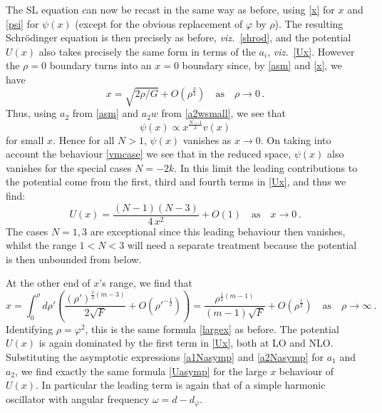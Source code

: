\documentclass[11pt,a4paper]{article}
\numberwithin{figure}{section}
\numberwithin{equation}{section}
\newcommand{\be}{\begin{equation}}
\newcommand{\ee}{\end{equation}}
\newcommand{\viz}{{\it viz.}\ }
\newcommand{\ph}{\varphi}
\begin{document}
The SL equation can now be recast in the same way as before, using \eqref{x} for $x$  and \eqref{psi} for $\psi(x)$ (except for the obvious replacement of $\ph$ by $\rho$). The resulting Schr\"odinger equation is then precisely as before, \viz \eqref{shrod}, and the potential $U(x)$ also takes precisely the same form in terms of the $a_i$, \viz \eqref{Ux}. 
However the $\rho=0$ boundary turns into an $x=0$ boundary since, by \eqref{asm} and \eqref{x}, we have
\begin{equation} \label{xsmall}
    x = \sqrt{2\rho/G} + O\left( \rho^\frac{3}{2} \right) \quad \text{as} \quad \rho \rightarrow 0 \,.
\end{equation}
Thus, using $a_2$ from \eqref{asm} and $a_2w$ from \eqref{a2wsmall}, we see that
\be\label{psism} \psi(x)\propto x^{\frac{N-1}{2}}v(x)\ee
for small $x$. Hence for all $N>1$, $\psi(x)$ vanishes as $x\to0$.  On taking into account the behaviour \eqref{vmcase} we see that in the reduced space, $\psi(x)$ also vanishes for the special cases $N=-2k$. In this limit the leading contributions to the potential come from the first, third and fourth terms in \eqref{Ux}, and thus we find:
\begin{equation} \label{Usm}
    U(x) = \frac{(N-1)(N-3)}{4\,x^2} +O(1)
 \quad \text{as} \quad x \rightarrow 0 \,.
\end{equation}
The cases $N=1,3$ are exceptional since this leading behaviour then vanishes, whilst the range $1<N<3$ will need a separate treatment because the potential is then unbounded from below.  


At the other end of $x$'s range, we find that 
\begin{equation} \label{xN}
    x = \int_0^\rho\!\!\! d\rho' \left( \frac{\left( \rho' \right)^{\frac{1}{2}(m-3)}}{2 \sqrt{F}} + O\left( \rho'^{-\frac{1}{2}} \right) \right) = \frac{\rho^{\frac{1}{2}(m-1)}}{(m-1) \sqrt{F}} + O\left( \rho^{\frac{1}{2}}\right) \quad \text{as} \quad \rho \rightarrow \infty \,.
\end{equation}
Identifying $\rho=\ph^2$, this is the same formula \eqref{largex} as before. The potential $U(x)$ is again dominated by the first term in \eqref{Ux}, both at LO and NLO. Substituting the asymptotic expressions \eqref{a1Nasymp} and \eqref{a2Nasymp} for $a_1$ and $a_2$, we find exactly the same formula \eqref{Uasymp} for the large $x$ behaviour of $U(x)$. In particular the leading term is again that of a simple harmonic oscillator with angular frequency $\omega = d-d_\ph$.
\end{document}
